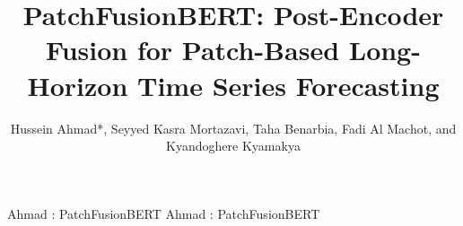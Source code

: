 \documentclass{ieeeaccess}
\begin{document}
\history{}
\doi{}

\title{PatchFusionBERT: Post-Encoder Fusion for Patch-Based Long-Horizon Time Series Forecasting}

\author{Hussein Ahmad*,
Seyyed Kasra Mortazavi,
Taha Benarbia,
Fadi Al Machot, and
Kyandoghere Kyamakya}
\address[1]{Institute for Smart Systems Technologies, Universität Klagenfurt, Klagenfurt, Austria}
\address[2]{Industrial Engineering Department, University of Oran 2, Oran, Algeria}
\address[3]{Department of Data Science, Norwegian University of Life Sciences, Ås, 1432, Norway}

\markboth
{Ahmad \headeretal: PatchFusionBERT}
{Ahmad \headeretal: PatchFusionBERT}

\end{document}

